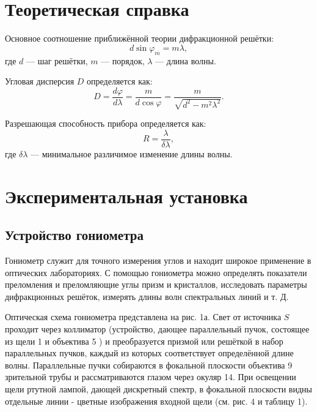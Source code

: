 \documentclass[a4paper, 12pt]{article}
\begin{document}
\section{Теоретическая справка}

Основное соотношение приближённой теории дифракционной решётки:
\begin{equation}
    d\sin\varphi_m = m\lambda,
    \label{eq:main}
\end{equation}
где \(d\) --- шаг решётки, \(m\) --- порядок, \(\lambda\) --- длина волны.

Угловая дисперсия \(D\) определяется как:
\begin{equation}
    D = \frac{d\varphi}{d\lambda} = \frac{m}{d \cos\varphi} = \frac{m}{\sqrt{d^{2}-m^{2}\lambda^{2}}}.
\end{equation}

Разрешающая способность прибора определяется как:
\begin{equation}
    R=\frac{\lambda}{\delta\lambda},
\end{equation}
где \(\delta \lambda\) --- минимальное различимое изменение длины волны.

\section{Экспериментальная установка}
\subsection{Устройство гониометра}

Гониометр служит для точного измерения углов и находит широкое применение в оптических лабораториях. С помощью гониометра можно определять показатели преломления и преломляющие углы призм и кристаллов, исследовать параметры дифракционных решёток, измерять длины волн спектральных линий и т. Д.

Оптическая схема гониометра представлена на рис. 1а. Свет от источника $S$ проходит через коллиматор (устройство, дающее параллельный пучок, состоящее из щели 1 и объектива 5 ) и преобразуется призмой или решёткой в набор параллельных пучков, каждый из которых соответствует определённой длине волны. Параллельные пучки собираются в фокальной плоскости объектива 9 зрительной трубы и рассматриваются глазом через окуляр 14. При освещении щели ртутной лампой, дающей дискретный спектр, в фокальной плоскости видны отдельные линии - цветные изображения входной щели (см. рис. 4 и таблицу 1).
\end{document}
